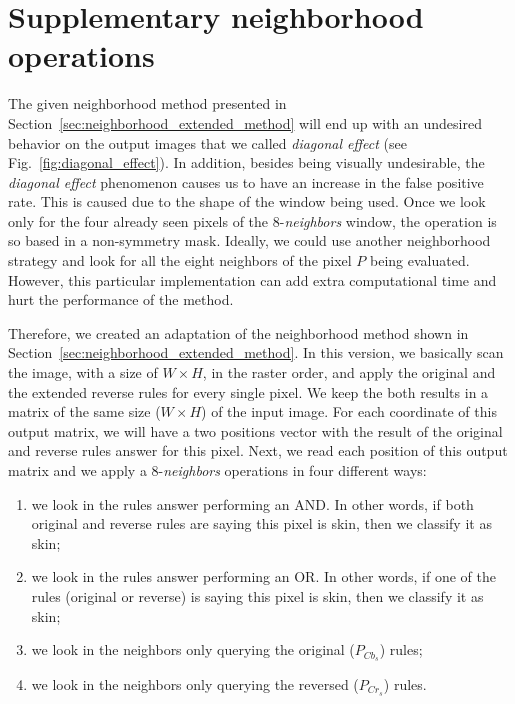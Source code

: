 \section{Supplementary neighborhood operations}
\label{sec:sup_neighborhood_operations}
The given neighborhood method presented in Section~\ref{sec:neighborhood_extended_method} will end up with an undesired behavior on the output images that we called \textit{diagonal effect} (see Fig.~\ref{fig:diagonal_effect}). In addition, besides being visually undesirable, the \textit{diagonal effect} phenomenon causes us to have an increase in the false positive rate. This is caused due to the shape of the window being used. Once we look only for the four already seen pixels of the 8-\textit{neighbors} window, the operation is so based in a non-symmetry mask. Ideally, we could use another neighborhood strategy and look for all the eight neighbors of the pixel $P$ being evaluated. However, this particular implementation can add extra computational time and hurt the performance of the method. 

Therefore, we created an adaptation of the neighborhood method shown in Section~\ref{sec:neighborhood_extended_method}. In this version, we basically scan the image, with a size of $W \times H$, in the raster order, and apply the original and the extended reverse rules for every single pixel. We keep the both results in a matrix of the same size ($W \times H$) of the input image. For each coordinate of this output matrix, we will have a two positions vector with the result of the original and reverse rules answer for this pixel. Next, we read each position of this output matrix and we apply a 8-\textit{neighbors} operations in four different ways:

\begin{enumerate}[label={(\arabic*)}]
    \item we look in the rules answer performing an AND. In other words, if both original and reverse rules are saying this pixel is skin, then we classify it as skin;
    \item we look in the rules answer performing an OR. In other words, if one of the rules (original or reverse) is saying this pixel is skin, then we classify it as skin;
    \item we look in the neighbors only querying the original ($P_{Cb_s}$) rules;
    \item we look in the neighbors only querying the reversed ($P_{Cr_s}$) rules.
\end{enumerate}

